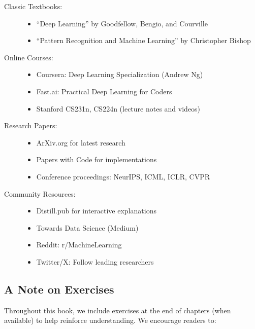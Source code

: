 \begin{description}
    \item[Classic Textbooks:]
    \begin{itemize}
        \item ``Deep Learning'' by Goodfellow, Bengio, and Courville
        \item ``Pattern Recognition and Machine Learning'' by Christopher Bishop
    \end{itemize}
    
    \item[Online Courses:]
    \begin{itemize}
        \item Coursera: Deep Learning Specialization (Andrew Ng)
        \item Fast.ai: Practical Deep Learning for Coders
        \item Stanford CS231n, CS224n (lecture notes and videos)
    \end{itemize}
    
    \item[Research Papers:]
    \begin{itemize}
        \item ArXiv.org for latest research
        \item Papers with Code for implementations
        \item Conference proceedings: NeurIPS, ICML, ICLR, CVPR
    \end{itemize}
    
    \item[Community Resources:]
    \begin{itemize}
        \item Distill.pub for interactive explanations
        \item Towards Data Science (Medium)
        \item Reddit: r/MachineLearning
        \item Twitter/X: Follow leading researchers
    \end{itemize}
\end{description}

\subsection{A Note on Exercises}

Throughout this book, we include exercises at the end of chapters (when available) to help reinforce understanding. We encourage readers to:

